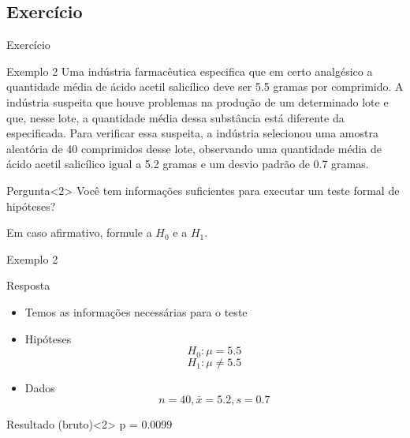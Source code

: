 \documentclass{beamer}
\begin{document}

\subsection{Exercício}

\begin{frame}{Exercício}
  \begin{exampleblock}{Exemplo 2}
    \footnotesize
    Uma indústria farmacêutica especifica que em certo analgésico a
    quantidade média de ácido acetil salicílico deve ser 5.5 gramas
    por comprimido. A indústria suspeita que houve problemas na
    produção de um determinado lote e que, nesse lote, a quantidade
    média dessa substância está diferente da especificada. Para
    verificar essa suspeita, a indústria selecionou uma amostra
    aleatória de 40 comprimidos desse lote, observando uma quantidade
    média de ácido acetil salicílico igual a 5.2 gramas e um desvio
    padrão de 0.7 gramas.
  \end{exampleblock}
  \begin{block}{Pergunta}<2>
    Você tem informações suficientes para executar um teste formal de hipóteses?

    Em caso afirmativo, formule a $H_0$ e a $H_1$.
  \end{block}
\end{frame}

\begin{frame}{Exemplo 2}
  \begin{exampleblock}{Resposta}
    \begin{itemize}
    \footnotesize
  \item Temos as informações necessárias para o teste
  \item Hipóteses
      \begin{displaymath}
        H_0: \mu = 5.5
      \end{displaymath}
      \begin{displaymath}
        H_1: \mu \ne 5.5
      \end{displaymath}
    \item Dados
      \begin{displaymath}
        n=40, \bar{x} = 5.2, s = 0.7
      \end{displaymath}
    \end{itemize}
  \end{exampleblock}
  \begin{exampleblock}{Resultado (bruto)}<2>
    p = 0.0099
  \end{exampleblock}
\end{frame}
\end{document}
